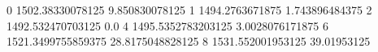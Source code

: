 0 1502.38330078125 9.850830078125
1 1494.2763671875 1.743896484375
2 1492.532470703125 0.0
4 1495.5352783203125 3.0028076171875
6 1521.3499755859375 28.8175048828125
8 1531.552001953125 39.01953125
